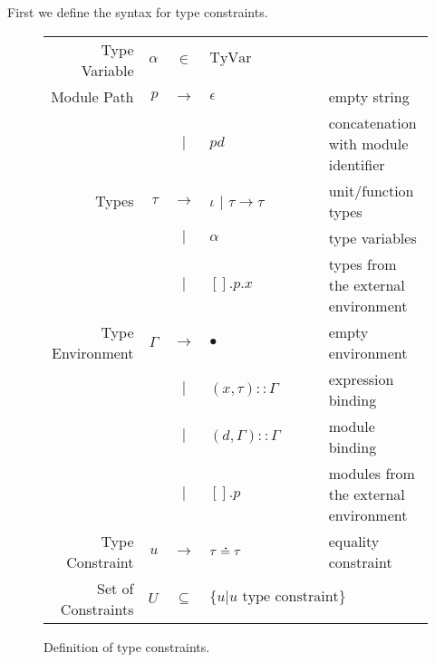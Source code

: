 \documentclass{article}
\theoremstyle{definition}
\newcommand*{\vbar}{|}
\newcommand*{\cons}{::}
\newcommand*{\A}[1]{\overset{\,_{\mbox{\Large .}}}{#1}}
\newcommand*{\modid}{d}
\newcommand*{\TyVar}{\text{TyVar}}
\begin{document}
First we define the syntax for type constraints.
\begin{figure}[h!]
  \centering
  \begin{tabular}{rrcll}
    Type Variable      & $\alpha$ & $\in$         & $\TyVar$                                                                 \\
    Module Path        & $p$      & $\rightarrow$ & $\epsilon$                       & empty string                          \\
                       &          & $\vbar$       & $p\modid$                        & concatenation with module identifier  \\
    Types              & $\tau$   & $\rightarrow$ & $\iota$ | $\tau\rightarrow\tau$  & unit/function types                   \\
                       &          & $\vbar$       & $\alpha$                         & type variables                        \\
                       &          & $\vbar$       & $[].p.x$                         & types from the external environment   \\
    Type Environment   & $\Gamma$ & $\rightarrow$ & $\bullet$                        & empty environment                     \\
                       &          & $\vbar$       & $(x,\tau)\cons \Gamma$           & expression binding                    \\
                       &          & $\vbar$       & $(\modid,\Gamma)\cons \Gamma$    & module binding                        \\
                       &          & $\vbar$       & $[].p$                           & modules from the external environment \\
    Type Constraint    & $u$      & $\rightarrow$ & $\tau\A{=}\tau$                  & equality constraint                   \\
    Set of Constraints & $U$      & $\subseteq$   & $\{u|u\text{ type constraint}\}$
  \end{tabular}
  \caption{Definition of type constraints.}
  \label{fig:typeqdom}
\end{figure}
\end{document}
